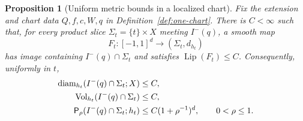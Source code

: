 \documentclass[10pt,a4paper]{article}
\numberwithin{equation}{section}
\newtheorem{proposition}[theorem]{Proposition}
\theoremstyle{definition}
\theoremstyle{remark}
\newcommand{\diam}{\operatorname{diam}}
\newcommand{\Vol}{\operatorname{Vol}}
\newcommand{\Lip}{\operatorname{Lip}}
\begin{document}
\begin{proposition}[Uniform metric bounds in a localized chart]
\label{prop:chart-bounds}
Fix the extension and chart data $Q,f,c,W,q$ in
Definition~\ref{def:one-chart}.  There
is $C<\infty$ such that, for every product slice
$\Sigma_t=\{t\}\times X$ meeting $I^-(q)$, a smooth map
\begin{equation}
 F_t:[-1,1]^d\longrightarrow(\Sigma_t,d_{h_t})
 \label{eq:uniform-map}
\end{equation}
has image containing $I^-(q)\cap\Sigma_t$ and satisfies $\Lip(F_t)\le C$.
Consequently, uniformly in $t$,
\begin{align}
 \diam_{h_t}(I^-(q)\cap\Sigma_t;X)&\le C,
 \notag\\
 \Vol_{h_t}(I^-(q)\cap\Sigma_t)&\le C,
 \notag\\
 \mathsf P_\rho(I^-(q)\cap\Sigma_t;h_t)&\le C(1+\rho^{-1})^d,
 \qquad 0<\rho\le1.
 \label{eq:localized-bounds}
\end{align}
\end{proposition}
\end{document}
